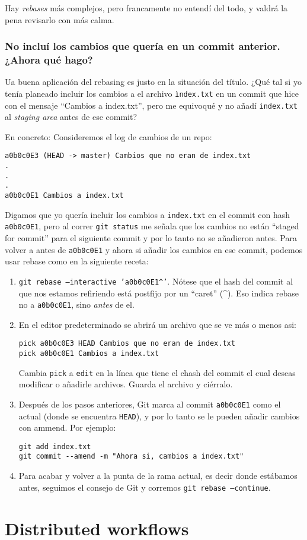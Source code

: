 \documentclass[spanish, 12pt, a4paper]{article}
\begin{document}
Hay \textit{rebases} más complejos, pero francamente no entendí del todo, y
valdrá la pena revisarlo con más calma.

\subsubsection{No incluí los cambios que quería en un commit anterior. ¿Ahora
qué hago?}
Ua buena aplicación del rebasing es justo en la situación del título. ¿Qué tal
si yo tenía planeado incluir los cambios a el archivo \texttt{ìndex.txt} en un
commit que hice con el mensaje ``Cambios a index.txt'', pero me equivoqué y no
añadí \texttt{index.txt} al \textit{staging area} antes de ese commit?

En concreto: Consideremos el log de cambios de un repo:
\begin{lstlisting}
a0b0c0E3 (HEAD -> master) Cambios que no eran de index.txt
.
.
.
a0b0c0E1 Cambios a index.txt
\end{lstlisting}

Digamos que yo quería incluir los cambios a \texttt{index.txt} en el commit con
hash \texttt{a0b0c0E1}, pero al correr \texttt{git status} me señala que los
cambios no están ``staged for commit'' para el siguiente commit y por lo tanto
no se añadieron antes.
Para volver a antes de \texttt{a0b0c0E1} y ahora si añadir los cambios en ese
commit, podemos usar rebase como en la siguiente receta:

\begin{enumerate}
	\item \texttt{git rebase --interactive 'a0b0c0E1\string^'}. Nótese que el
		hash del commit al que nos estamos refiriendo está postfijo por un
		``caret'' (\string^). Eso indica rebase no a \texttt{a0b0c0E1}, sino
		\textit{antes} de el.
	\item En el editor predeterminado se abrirá un archivo que se ve más o menos
		asi:
\begin{lstlisting}
pick a0b0c0E3 HEAD Cambios que no eran de index.txt
pick a0b0c0E1 Cambios a index.txt
\end{lstlisting}
	Cambia \texttt{pick} a \texttt{edit} en la línea que tiene el chash del
	commit el cual deseas modificar o añadirle archivos. Guarda el archivo y
	ciérralo.
	\item Después de los pasos anteriores, Git marca al commit \texttt{a0b0c0E1}
		como el actual (donde se encuentra \texttt{HEAD}), y por lo tanto se le
		pueden añadir cambios con ammend. Por ejemplo:
\begin{lstlisting}
git add index.txt
git commit --amend -m "Ahora si, cambios a index.txt"
\end{lstlisting}
	\item Para acabar y volver a la punta de la rama actual, es decir donde
		estábamos antes, seguimos el consejo de Git y corremos \texttt{git
		rebase --continue}.
\end{enumerate}


\section{Distributed workflows}
\end{document}

